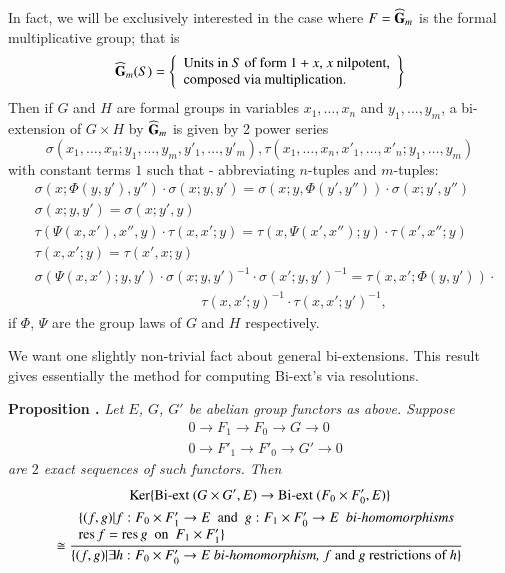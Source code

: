 In fact, we will be exclusively interested in the case where $F=\widehat{\mathbf{G}}_{m}$ is the formal multiplicative group; that is
$$
\widehat{\mathbf{G}}_{m}(S)=
\left\{
\begin{array}{l}
\text{Units in $S$ of form $1+x$, $x$ nilpotent,}\\
\text{composed via multiplication.}
\end{array}
\right\}
$$
Then if $G$ and $H$ are formal groups in variables $x_{1},\ldots,x_{n}$ and $y_{1},\ldots,y_{m}$, a bi-extension of $G\times H$ by $\widehat{\mathbf{G}}_{m}$ is given by 2 power series 
$$
\sigma(x_{1},\ldots,x_{n};y_{1},\ldots,y_{m},y'_{1},\ldots,y'_{m}), \tau(x_{1},\ldots,x_{n},x'_{1},\ldots,x'_{n};y_{1},\ldots,y_{m})
$$ 
with constant terms $1$ such that - abbreviating $n$-tuples and $m$-tuples:
\begin{align*}
& \sigma(x;\Phi(y,y'),y'')\cdot \sigma(x;y,y')=\sigma(x;y,\Phi(y',y''))\cdot \sigma (x;y',y'')\\
& \sigma(x;y,y')=\sigma(x;y',y)\\
& \tau (\Psi(x,x'),x'',y)\cdot \tau(x,x';y)=\tau(x,\Psi(x',x'');y)\cdot \tau(x',x'';y)\\
& \tau (x,x';y)=\tau(x',x;y)\\
& \sigma(\Psi(x,x');y,y')\cdot \sigma(x;y,y')^{-1}\cdot \sigma (x';y,y')^{-1}=\tau(x,x';\Phi(y,y'))\cdot\\
&\hspace{5cm} \tau(x,x';y)^{-1}\cdot \tau(x,x';y')^{-1},
\end{align*}
if $\Phi$, $\Psi$ are the group laws of $G$ and $H$ respectively.

We want one slightly non-trivial fact about general bi-extensions. This result gives essentially the method for computing Bi-ext's via resolutions.

\medskip
\noindent
{\bf Proposition .\label{art15-prop1}}
{\em Let $E$, $G$, $G'$ be abelian group functors as above. Suppose}
\begin{align*}
& 0\to F_{1}\to F_{0}\to G\to 0\\
& 0\to F'_{1}\to F'_{0}\to G'\to 0
\end{align*}
{\em are $2$ exact sequences of such functors. Then}
{\fontsize{10pt}{12pt}\selectfont
\begin{gather*}
\operatorname{\mathrm{Ker}} \{\text{\rm Bi-ext }(G\times G',E)\to \text{\rm Bi-ext } (F_{0}\times F'_{0},E)\}\\
\cong \frac{\begin{array}{l}\{(f,g)|f:F_{0}\times F'_{1}\to E\text{~ and~ } g:F_{1}\times F'_{0}\to E\text{\em~ bi-homomorphisms}\\ \operatorname{\mathrm{res}} f=\operatorname{\mathrm{res}} g\text{~ on~ } F_{1}\times F'_{1}\}\end{array}}{\{(f,g)|\exists h:F_{0}\times F'_{0}\to E\text{\em \ bi-homomorphism,~} f \text{~and~} g \text{~restrictions of~} h\}}
\end{gather*}}\relax\pageoriginale

